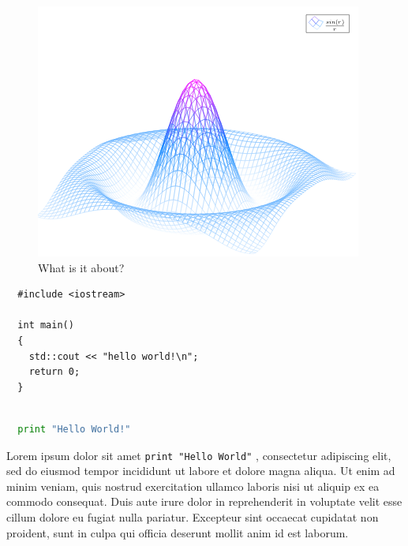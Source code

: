 \documentclass{article}
\begin{document}
\begin{figure}[h]
  \includegraphics[width=0.25\linewidth]{mesh.png}
  \caption{What is it about?}
  \label{fig:whateverlabel}
\end{figure}

\begin{verbatim}
  #include <iostream>

  int main()
  {
    std::cout << "hello world!\n";
    return 0;
  }
\end{verbatim}

\begin{lstlisting}[language=Python]

  print "Hello World!"

\end{lstlisting}



Lorem ipsum dolor sit amet \lstinline{print "Hello World"} , consectetur adipiscing elit, sed do eiusmod tempor incididunt ut labore et dolore magna aliqua. Ut enim ad minim veniam, quis nostrud exercitation ullamco laboris nisi ut aliquip ex ea commodo consequat. Duis aute irure dolor in reprehenderit in voluptate velit esse cillum dolore eu fugiat nulla pariatur. Excepteur sint occaecat cupidatat non proident, sunt in culpa qui officia deserunt mollit anim id est laborum.


\end{document}
